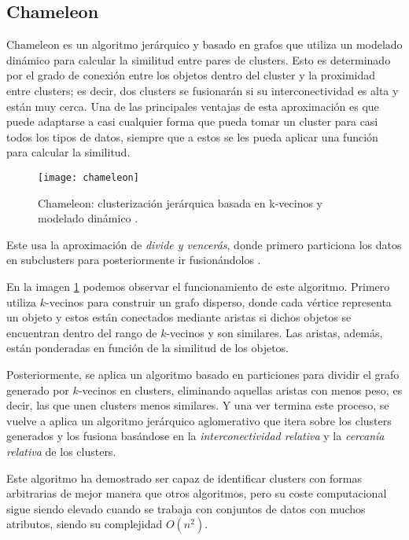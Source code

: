 \documentclass[10pt, a4paper]{article}
\begin{document}


\subsection{\textbf{Chameleon}} \label{subsec:Chameleon}


\cite{chameleon} Chameleon es un algoritmo jerárquico y basado en grafos que utiliza un modelado dinámico para calcular la similitud entre pares de clusters. Esto es determinado por el grado de conexión entre los objetos dentro del cluster y la proximidad entre clusters; es decir, dos clusters se fusionarán si su interconectividad es alta y están muy cerca. Una de las principales ventajas de esta aproximación es que puede adaptarse a casi cualquier forma que pueda tomar un cluster para casi todos los tipos de datos, siempre que a estos se les pueda aplicar una función para calcular la similitud.

\begin{figure}[ht]
\centering
\texttt{[image: chameleon]}
\caption{Chameleon: clusterización jerárquica basada en k-vecinos y modelado dinámico \cite{LIBRO}.}
\label{fig:chameleon}
\end{figure}

Este usa la aproximación de \textit{divide y vencerás}, donde primero particiona los datos en subclusters para posteriormente ir fusionándolos \cite{articulo14}.

En la imagen \ref{fig:chameleon} podemos observar el funcionamiento de este algoritmo. Primero utiliza $k$-vecinos para construir un grafo disperso, donde cada vértice representa un objeto y estos están conectados mediante aristas si dichos objetos se encuentran dentro del rango de $k$-vecinos y son similares. Las aristas, además, están ponderadas en función de la similitud de los objetos. 

Posteriormente, se aplica un algoritmo basado en particiones para dividir el grafo generado por $k$-vecinos en clusters, eliminando aquellas aristas con menos peso, es decir, las que unen clusters menos similares. Y una ver termina este proceso, se vuelve a aplica un algoritmo jerárquico aglomerativo que itera sobre los clusters generados y los fusiona basándose en la \textit{interconectividad relativa} y la \textit{cercanía relativa} de los clusters.

Este algoritmo ha demostrado ser capaz de identificar clusters con formas arbitrarias de mejor manera que otros algoritmos, pero su coste computacional sigue siendo elevado cuando se trabaja con conjuntos de datos con muchos atributos, siendo su complejidad $O\left(n^2\right)$.
\end{document}
